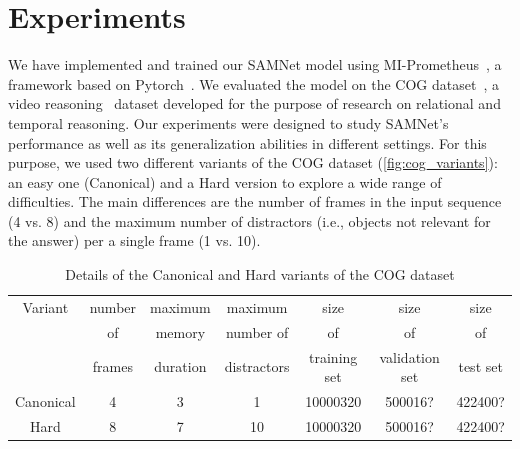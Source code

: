 \section{Experiments}

We have implemented and trained our SAMNet model using MI-Prometheus~\cite{kornuta2018accelerating}, a framework based on Pytorch~\cite{paszke2017automatic}. 
We evaluated the model on the COG dataset~\cite{yang2018dataset}, a video reasoning~\cite{mogadala2019trends} dataset developed for the purpose of research on relational and temporal reasoning.
Our experiments were designed to study SAMNet's performance as well as its generalization abilities in different settings.
For this purpose, we used two different variants of the COG dataset (\cref{fig:cog_variants}): an easy one (Canonical) and a Hard version to explore a wide range of difficulties.
The main differences are the number of frames in the input sequence (4 vs. 8) and the maximum number of distractors (i.e., objects not relevant for the answer) per a single frame (1 vs. 10).


\begin{table}[htb]
\caption{Details of the Canonical and Hard variants of the COG dataset}
\centering
\begin{tabular}{ccccccc}
	\toprule
	Variant    &  	number &  	maximum & maximum & size & size & size  \\ 
	& of   & memory & number of & of & of & of  \\
	& frames & duration & distractors & training set & validation set & test set \\
	\midrule
	Canonical & 4 & 3 & 1 & 10000320 & 500016? & 422400? \\	
	Hard  & 8 & 7 & 10 & 10000320 & 500016?  & 422400? \\
	\bottomrule	
\end{tabular}
\label{tab:cog_variants}
\end{table}




%
%

